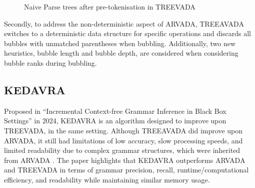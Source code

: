 \begin{figure}[h!]
\caption{Naive Parse trees after pre-tokenisation in TREEVADA \cite{arefinFastDeterministicBlackbox2024}}
\label{fig:pre-tokenised trees}
\end{figure}

Secondly, to address the non-deterministic aspect of ARVADA, TREEAVADA switches to a deterministic data structure for specific operations and discards all bubbles with unmatched parentheses when bubbling. Additionally, two new heuristics, bubble length and bubble depth, are considered when considering bubble ranks during bubbling.

\subsection{KEDAVRA}

Proposed in \enquote{Incremental Context-free Grammar Inference in Black Box
Settings} \cite{liIncrementalContextfreeGrammar2024} in 2024, KEDAVRA is an algorithm designed to improve upon TREEVADA, in the same setting. Although TREEAVADA did improve upon ARVADA, it still had limitations of low accuracy, slow processing speeds, and limited readability due to complex grammar structures, which were inherited from ARVADA \cite{liIncrementalContextfreeGrammar2024,kulkarniLearningHighlyRecursive2021}. 
The paper highlights that KEDAVRA outperforms ARVADA and TREEVADA in terms of grammar precision, recall, runtime/computational efficiency, and readability while maintaining similar memory usage.

